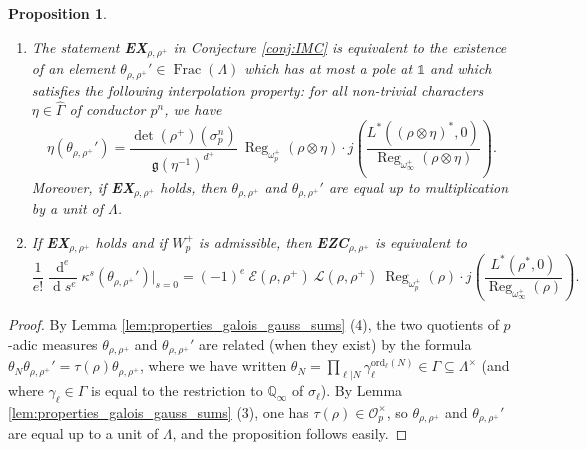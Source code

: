 \documentclass[12pt]{amsart}
\newcommand\bC{\mathbb{C}}
\newcommand\bQ{\mathbb{Q}}
\newcommand\cE{\mathcal{E}}
\newcommand\cL{\mathcal{L}}
\newcommand\cO{\mathcal{O}}
\newcommand\g{\mathfrak{g}}
\newcommand{\ob}[1]{\mkern 1.5mu\overline{\mkern-1.5mu#1\mkern-1.5mu}\mkern 1.5mu}
\newcommand{\ord}{\mathrm{ord}}
\DeclareMathOperator{\Frac}{Frac}
\DeclareMathOperator{\Reg}{Reg}
\DeclareMathOperator{\diff}{d}
\newcommand\finir{{\color{red} A finir ! }}
\theoremstyle{defstyle}
\theoremstyle{thmstyle}
\newtheorem{proposition}[subsubsection]{Proposition}
\begin{document}
\begin{proposition}\label{prop:renormalisation_mesure_p_adique}\hspace{2em}
		\begin{enumerate}
		\item The statement \textbf{EX}$_{\rho,\rho^+}$ in Conjecture \ref{conj:IMC} is equivalent to the existence of an element $\theta_{\rho,\rho^+}'\in\Frac(\Lambda)$ which has at most a pole at $\mathds{1}$ and which satisfies the following interpolation property: for all non-trivial characters $\eta\in\widehat{\Gamma}$ of conductor $p^n$, we have
		$$\eta(\theta_{\rho,\rho^+}')=\frac{\det(\rho^+)(\sigma_p^n)}{\g(\eta^{-1})^{d^+}}\ \Reg_{\omega_p^+}(\rho\otimes\eta)\cdot j\left(\dfrac{L^{*}\left((\rho \otimes \eta)^*,0\right)}{\Reg_{\omega_\infty^+}(\rho\otimes\eta)}\right).$$ 
		Moreover, if \textbf{EX}$_{\rho,\rho^+}$ holds, then $\theta_{\rho,\rho^+}$ and $\theta_{\rho,\rho^+}'$ are equal up to multiplication by a unit of $\Lambda$.
		\item If \textbf{EX}$_{\rho,\rho^+}$ holds and if $W_p^+$ is admissible, then \textbf{EZC}$_{\rho,\rho^+}$ is equivalent to $$\frac{1}{e!} \dfrac{\diff^e}{\diff \!s^e}\kappa^s(\theta_{\rho,\rho^+}')\bigg|_{s=0}=(-1)^e\ \cE(\rho,\rho^+)\ \cL(\rho,\rho^+)\ \Reg_{\omega_p^+}(\rho) \cdot j\left(\dfrac{L^{*}\left(\rho^*,0\right)}{\Reg_{\omega_\infty^+}(\rho)}\right). $$ 
	\end{enumerate}
\end{proposition}
\begin{proof}
By Lemma \ref{lem:properties_galois_gauss_sums} (4), the two quotients of $p$-adic measures $\theta_{\rho,\rho^+}$ and $\theta_{\rho,\rho^+}'$ are related (when they exist) by the formula $\theta_N \theta_{\rho,\rho^+}'=\tau(\rho)\theta_{\rho,\rho^+}$, where we have written $\theta_N=\prod_{\ell|N}\gamma_\ell^{\ord_\ell(N)}\in\Gamma\subseteq\Lambda^\times$ (and where $\gamma_\ell\in\Gamma$ is equal to the restriction to $\bQ_\infty$ of $\sigma_\ell$). By Lemma \ref{lem:properties_galois_gauss_sums} (3), one has $\tau(\rho)\in\cO_p^\times$, so $\theta_{\rho,\rho^+}$ and $\theta_{\rho,\rho^+}'$ are equal up to a unit of $\Lambda$, and the proposition follows easily.
\end{proof}


\end{document}
